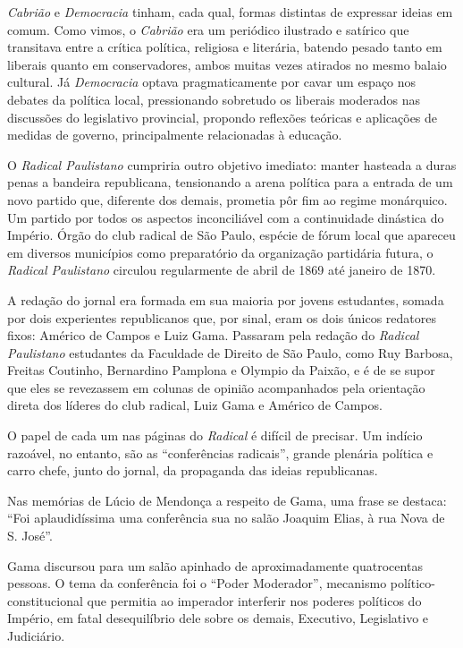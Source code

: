 \emph{Cabrião} e \emph{Democracia} tinham, cada qual, formas distintas
de expressar ideias em comum. Como vimos, o \emph{Cabrião} era um
periódico ilustrado e satírico que transitava entre a crítica política,
religiosa e literária, batendo pesado tanto em liberais quanto em
conservadores, ambos muitas vezes atirados no mesmo balaio cultural. Já
\emph{Democracia} optava pragmaticamente por cavar um espaço nos debates
da política local, pressionando sobretudo os liberais moderados nas
discussões do legislativo provincial, propondo reflexões teóricas e
aplicações de medidas de governo, principalmente relacionadas à
educação.

O \emph{Radical Paulistano} cumpriria outro objetivo imediato: manter
hasteada a duras penas a bandeira republicana, tensionando a arena
política para a entrada de um novo partido que, diferente dos demais,
prometia pôr fim ao regime monárquico. Um partido por todos os aspectos
inconciliável com a continuidade dinástica do Império. Órgão do
club radical de São Paulo, espécie de fórum local que apareceu em
diversos municípios como preparatório da organização partidária futura,
o \emph{Radical Paulistano} circulou regularmente de abril de 1869 até
janeiro de 1870.

A redação do jornal era formada em sua maioria por jovens estudantes,
somada por dois experientes republicanos que, por sinal, eram os dois
únicos redatores fixos: Américo de Campos e Luiz Gama. Passaram pela
redação do \emph{Radical Paulistano} estudantes da Faculdade de Direito
de São Paulo, como Ruy Barbosa, Freitas Coutinho, Bernardino Pamplona e
Olympio da Paixão, e é de se supor que eles se revezassem em colunas de
opinião acompanhados pela orientação direta dos líderes do club
radical, Luiz Gama e Américo de Campos.

O papel de cada um nas páginas do \emph{Radical} é difícil de precisar.
Um indício razoável, no entanto, são as ``conferências radicais'', grande
plenária política e carro chefe, junto do jornal, da propaganda das
ideias republicanas.

Nas memórias de Lúcio de Mendonça a respeito de Gama, uma frase se
destaca: ``Foi aplaudidíssima uma conferência sua no salão Joaquim Elias,
à rua Nova de S. José''.

Gama discursou para um salão apinhado de aproximadamente quatrocentas
pessoas. O tema da conferência foi o ``Poder Moderador'', mecanismo
político-constitucional que permitia ao imperador interferir nos poderes
políticos do Império, em fatal desequilíbrio dele sobre os demais,
Executivo, Legislativo e Judiciário.

